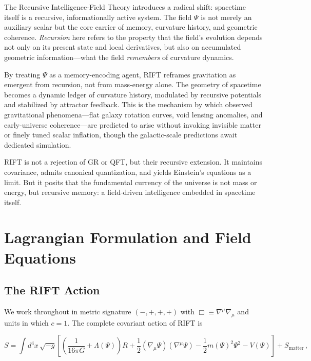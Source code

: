 \documentclass[12pt,a4paper]{article}
\begin{document}
The Recursive Intelligence-Field Theory introduces a radical shift:
spacetime itself is a recursive, informationally active system. The
field $\Psi$ is not merely an auxiliary scalar but the core carrier of
memory, curvature history, and geometric coherence. \emph{Recursion}
here refers to the property that the field's evolution depends not only
on its present state and local derivatives, but also on accumulated
geometric information---what the field \emph{remembers} of curvature dynamics.

By treating $\Psi$ as a memory-encoding agent, RIFT reframes gravitation as
emergent from recursion, not from mass-energy alone. The geometry of spacetime
becomes a dynamic ledger of curvature history, modulated by recursive potentials
and stabilized by attractor feedback. This is the mechanism by which observed
gravitational phenomena---flat galaxy rotation curves, void lensing anomalies,
and early-universe coherence---are predicted to arise without invoking invisible
matter or finely tuned scalar inflation, though the galactic-scale predictions
await dedicated simulation.

RIFT is not a rejection of GR or QFT, but their recursive extension. It maintains
covariance, admits canonical quantization, and yields Einstein's equations as a
limit. But it posits that the fundamental currency of the universe is not mass or
energy, but recursive memory: a field-driven intelligence embedded in spacetime itself.

\section{Lagrangian Formulation and Field Equations}
\label{sec:lagrangian}

\subsection{The RIFT Action}

We work throughout in metric signature $(-,+,+,+)$ with
$\Box \equiv \nabla^\mu\nabla_\mu$ and units in which $c = 1$.
The complete covariant action of RIFT is

\begin{equation}
\label{eq:action}
S = \int d^4x\,\sqrt{-g}
\left[
  \left(\frac{1}{16\pi G} + \Lambda(\Psi)\right)R
  + \frac{1}{2}(\nabla_\mu\Psi)(\nabla^\mu\Psi)
  - \frac{1}{2}m(\Psi)^2\Psi^2
  - V(\Psi)
\right]
+ S_{\mathrm{matter}}\,,
\end{equation}
\end{document}
